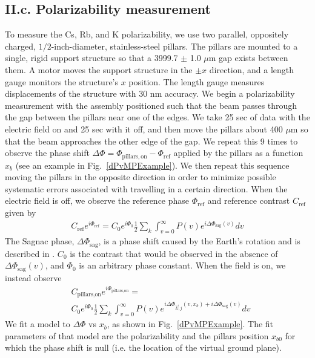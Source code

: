 \documentclass[twocolumn,prl,showpacs,superscriptaddress,longbibliography]{revtex4-1}   %
\newcommand{\figref}[1]{Fig.~\ref{#1}}
\newcommand{\dphisag}{\Delta\Phi_{\mathrm{sag}}}
\begin{document}
\subsection{II.c. Polarizability measurement}

To measure the Cs, Rb, and K polarizability, we use two parallel, oppositely charged, $1/2$-inch-diameter, stainless-steel pillars. The pillars are mounted to a single, rigid support structure so that a 3999.7 $\pm$ 1.0 $\mu$m gap exists between them. A motor moves the support structure in the $\pm x$ direction, and a length gauge monitors the structure's $x$ position. The length gauge measures displacements of the structure with 30 nm accuracy. 
We begin a polarizability measurement with the assembly positioned such that the beam passes through the gap between the pillars near one of the edges.
We take 25 sec of data with the electric field on and 25 sec with it off, and then move the pillars about 400 $\mu$m so that the beam approaches the other edge of the gap. We repeat this 9 times to 
observe the phase shift $\Delta\Phi = \Phi_{\mathrm{pillars,on}} - \Phi_{\mathrm{ref}}$ applied by the pillars as a function $x_b$ (see an example in \figref{dPvMPExample}). 
We then repeat this sequence moving the pillars in the opposite direction in order to minimize possible systematic errors associated with travelling in a certain direction.
When the electric field is off, we observe the reference phase $\Phi_{\mathrm{ref}}$ and reference contrast $C_{\mathrm{ref}}$ given by 
\begin{align}
	C_{\mathrm{ref}}e^{i\Phi_{\mathrm{ref}}} = 
		C_0e^{i\Phi_0} \frac{1}{2} \sum_k
		\int_{v=0}^{\infty} P(v)
		e^{i\dphisag(v)} 
		dv
	\label{CPPolesRef}
\end{align}
The Sagnac phase, $\dphisag$, is a phase shift caused by the Earth's rotation and is described in \cite{Holmgren2010,Lenef1997,Jacquey2008}.
$C_0$ is the contrast that would be observed in the absence of $\dphisag(v)$, and $\Phi_0$ is an arbitrary phase constant.
When the field is on, we instead observe
\begin{align}
	& C_{\textrm{pillars,on}}e^{i\Phi_{\textrm{pillars,on}}} = \nonumber \\
		& C_0e^{i\Phi_0}		
		\frac{1}{2} \sum_k
		\int_{v=0}^{\infty} P(v)
		e^{
			i\Delta\Phi_{\vec{E},j}(v,x_b) + 
			i\dphisag(v)
		} 
		dv
	\label{CPPolesEOn}
\end{align}
We fit a model to $\Delta\Phi$ vs $x_b$, as shown in \figref{dPvMPExample}. The fit parameters of that model are the polarizability and the pillars position $x_{b0}$ for which the phase shift is null (i.e. the location of the virtual ground plane). 
\end{document}
